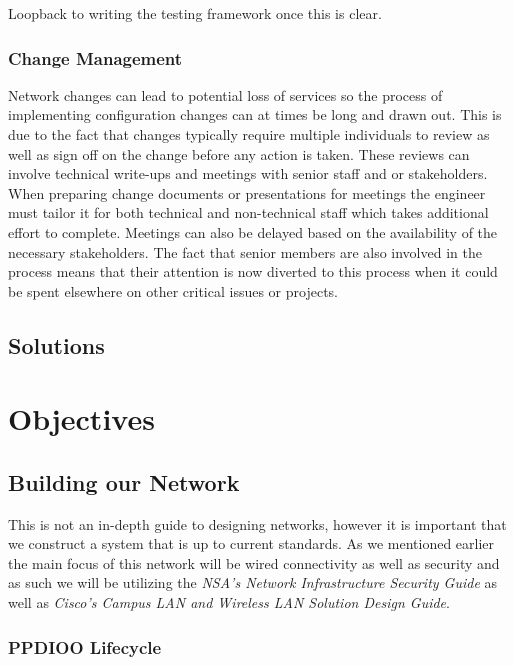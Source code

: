 \documentclass[12pt, letterpaper]{article}
\begin{document}
\smallskip

Loopback to writing the testing framework once this is clear.

	
	\subsubsection{Change Management}
Network changes can lead to potential loss of services so the process of implementing configuration changes can at times be long and drawn out. This is due to the fact that changes typically require multiple individuals to review as well as sign off on the change before any action is taken. These reviews can involve technical write-ups and meetings with senior staff and or stakeholders. When preparing change documents or presentations for meetings the engineer must tailor it for both technical and non-technical staff which takes additional effort to complete. Meetings can also be delayed based on the availability of the necessary stakeholders. The fact that senior members are also involved in the process means that their attention is now diverted to this process when it could be spent elsewhere on other critical issues or projects.


	\subsection{Solutions}


\newpage

\section{Objectives}

	\subsection{Building our Network}
This is not an in-depth guide to designing networks, however it is important that we construct a system that is up to current standards. As we mentioned earlier the main focus of this network will be wired connectivity as well as security and as such we will be utilizing the \textit{NSA’s Network Infrastructure Security Guide} as well as \textit{Cisco’s Campus LAN and Wireless LAN Solution Design Guide}.

	\subsubsection{PPDIOO Lifecycle}
\end{document}
